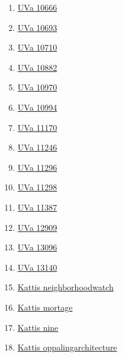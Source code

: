 \begin{enumerate}
\item \href{https://onlinejudge.org/index.php?option=com_onlinejudge&Itemid=8&page=show_problem&problem=1607}{UVa 10666}
\item \href{https://onlinejudge.org/index.php?option=com_onlinejudge&Itemid=8&page=show_problem&problem=1634}{UVa 10693}
\item \href{https://onlinejudge.org/index.php?option=com_onlinejudge&Itemid=8&page=show_problem&problem=1651}{UVa 10710}
\item \href{https://onlinejudge.org/index.php?option=com_onlinejudge&Itemid=8&page=show_problem&problem=1823}{UVa 10882}
\item \href{https://onlinejudge.org/index.php?option=com_onlinejudge&Itemid=8&page=show_problem&problem=1911}{UVa 10970}
\item \href{https://onlinejudge.org/index.php?option=com_onlinejudge&Itemid=8&page=show_problem&problem=1935}{UVa 10994}
\item \href{https://onlinejudge.org/index.php?option=com_onlinejudge&Itemid=8&page=show_problem&problem=2111}{UVa 11170}
\item \href{https://onlinejudge.org/index.php?option=com_onlinejudge&Itemid=8&page=show_problem&problem=2203}{UVa 11246}
\item \href{https://onlinejudge.org/index.php?option=com_onlinejudge&Itemid=8&page=show_problem&problem=2271}{UVa 11296}
\item \href{https://onlinejudge.org/index.php?option=com_onlinejudge&Itemid=8&page=show_problem&problem=2273}{UVa 11298}
\item \href{https://onlinejudge.org/index.php?option=com_onlinejudge&Itemid=8&page=show_problem&problem=2382}{UVa 11387}
\item \href{https://onlinejudge.org/index.php?option=com_onlinejudge&Itemid=8&page=show_problem&problem=4774}{UVa 12909}
\item \href{https://onlinejudge.org/index.php?option=com_onlinejudge&Itemid=8&page=show_problem&problem=4994}{UVa 13096}
\item \href{https://onlinejudge.org/index.php?option=com_onlinejudge&Itemid=8&page=show_problem&problem=5051}{UVa 13140}
\item \href{https://open.kattis.com/problems/neighborhoodwatch}{Kattis neighborhoodwatch}
\item \href{https://open.kattis.com/problems/mortage}{Kattis mortage}
\item \href{https://open.kattis.com/problems/nine}{Kattis nine}
\item \href{https://open.kattis.com/problems/oppalingarchitecture}{Kattis oppalingarchitecture}

\end{enumerate}
